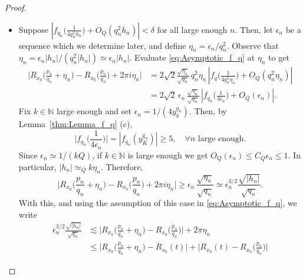 \documentclass[10pt,a4paper]{amsart}
\begin{document}
\begin{proof}
\begin{itemize}
\begin{itemize}
\begin{itemize}
		\item[\textbf{Case 2.1.2.}] Suppose $\left|  f_{q_n}\Big( \frac{1}{4q_n^2 h_n}  \Big)  + O_Q\left( q_n^2 h_n  \right) \right| < \delta$ for all large enough $n$. 
		Then, let $\epsilon_n$ be a sequence which we determine later,
		and define $\eta_n = \epsilon_n /q_n^2$. 
		Observe that $\eta_n = \epsilon_n |h_n| / (q_n^2 |h_n|) \simeq \epsilon_n |h_n|$. 
		Evaluate \eqref{eq:Asymptotic_f_q} at $\eta_n$ to get 
		\begin{equation}
		\begin{split}
		\Big|  R_{x_0}\Big( \frac{p_n}{q_n} + \eta_n \Big) - R_{x_0}\Big( \frac{p_n}{q_n} \Big) + 2\pi i \eta_n  \Big|
	& = 2\sqrt{2}  \frac{\sqrt{\eta_n}}{\sqrt{q_n}} \,  q_n^2 \eta_n \,
\left|  f_q\Big( \frac{1}{4q_n^2 \eta_n}  \Big)  + O_Q\left( q_n^{2} \eta_n  \right)
\right| \\
& = 2\sqrt{2} \,   \epsilon_n \,  \frac{\sqrt{\eta_n}}{\sqrt{q_n}} \,  
\left|  f_{q_n}\Big( \frac{1}{4 \epsilon_n}  \Big)  + O_Q\left( \epsilon_n  \right)
\right|. 
\end{split}
		\end{equation}
		Fix $k \in \mathbb N$ large enough and set $\epsilon_n = 1/(4y_k^{q_n})$.
		Then, by Lemma~\ref{thm:Lemma_f_q} (c), 
		\begin{equation}
		\Big|  f_{q_n}\Big( \frac{1}{4 \epsilon_n}  \Big) \Big| = \left|  f_{q_n}( y_K^{q_n}) \right| \geq 5,  \quad \forall n \text{ large enough.}
		\end{equation}
		Since $\epsilon_n \simeq 1/(kQ)$, 
		if $k \in \mathbb N$ is large enough we get $ O_Q\left( \epsilon_n  \right) \leq C_Q \epsilon_n \leq 1$.
		In particular, $|h_n| \simeq_Q k \eta_n$. 
		Therefore, 
		\begin{equation}
		\Big|  R_{x_0}\Big( \frac{p_n}{q_n} + \eta_n \Big) - R_{x_0}\Big( \frac{p_n}{q_n} \Big) + 2\pi i \eta_n  \Big|
 \geq  \epsilon_n\,  \frac{\sqrt{\eta_n}}{\sqrt{q_n}} 
 \simeq \epsilon_n^{3/2} \frac{\sqrt{|h_n|}}{\sqrt{q_n}}. 
		\end{equation}
		With this, and using the assumption of this case in \eqref{eq:Asymptotic_f_q}, we write
		\begin{equation}
		\begin{split}
		\epsilon_n^{3/2} \frac{\sqrt{|h_n|}}{\sqrt{q_n}}
		&  \lesssim \Big|  R_{x_0}\Big( \frac{p_n}{q_n} + \eta_n \Big) - R_{x_0}\Big( \frac{p_n}{q_n} \Big)\Big| + 2\pi \eta_n   \\
		& \leq \Big|  R_{x_0}\Big( \frac{p_n}{q_n} + \eta_n \Big) - R_{x_0}(t) \Big| 
		+ \Big| R_{x_0}(t) - R_{x_0}\Big( \frac{p_n}{q_n} \Big)\Big| 

\end{split}
\end{equation}
\end{itemize}
\end{itemize}
\end{itemize}
\end{proof}
\end{document}
